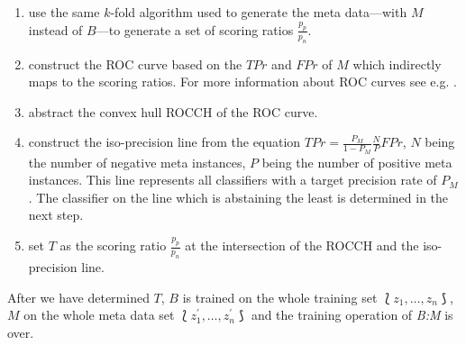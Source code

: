 \documentclass[twoside,11pt]{article}
\begin{document}
\begin{enumerate}

  \item use the same $k$-fold algorithm used to generate
        the meta data---with $M$ instead of $B$---to
        generate a set of scoring ratios $\frac{p_p}{p_n}$.

  \item construct the ROC curve based on the $TPr$ and
        $FPr$ of $M$ which indirectly maps to the scoring
        ratios. For more information about ROC curves
        see e.g. \citet{fawcett_2006}.

  \item abstract the convex hull ROCCH of the ROC curve.

  \item construct the iso-precision line from the equation
        $TPr = \frac{P_M}{1-P_M} \frac{N}{P} FPr$, $N$
        being the number of negative meta instances, $P$
        being the number of positive meta instances.
        This line represents all classifiers with a target
        precision rate of $P_M$. The classifier on the line
        which is abstaining the least is determined in the
        next step.

  \item set $T$ as the scoring ratio $\frac{p_p}{p_n}$ at
        the intersection of the ROCCH and the iso-precision
        line.

\end{enumerate}

After we have determined $T$, $B$ is trained on the whole
training set $\Lbag z_1,\dots,z_n \Rbag$, $M$ on the
whole meta data set
$\Lbag z^{\prime}_1,\dots,z^{\prime}_n \Rbag$ and the
training operation of \textit{B:M} is over.
\end{document}
